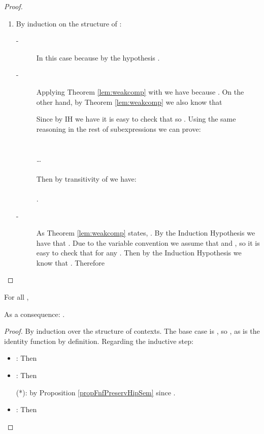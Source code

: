 \begin{proof}
\begin{enumerate}
\begin{description}
\end{description}

\item By induction on the structure of :
    \begin{description}
    \item[ -] In this case  because by the hypothesis .
    \item[ -] Applying Theorem \ref{lem:weakcomp} with  we have  because . On the other hand, by Theorem \ref{lem:weakcomp} we also know that 
    
    Since by IH we have  it is easy to check that  so . Using the same reasoning in the rest of subexpressions  we can prove:\\ \\
\\
\ldots \\
\\
Then by  transitivity of  we have:\\
 
 \\
.
    \item[ -] As Theorem \ref{lem:weakcomp} states, . By the Induction Hypothesis we have that . Due to the variable convention we assume that  and , so it is easy to check that  for any . Then by the Induction Hypothesis we know that . Therefore 

    \end{description}
\end{enumerate}
\end{proof}





For all , 

As a consequence: .

\begin{proof}\label{DEMO_CompHipSem}
By induction over the structure of contexts. The base case is , so , as  is the identity function by definition. Regarding the inductive step:
\begin{itemize}
 \item : Then

 \item : Then

(*): by Proposition \ref{propFnfPreservHipSem}  since . \item : Then

\end{itemize}
\end{proof}




